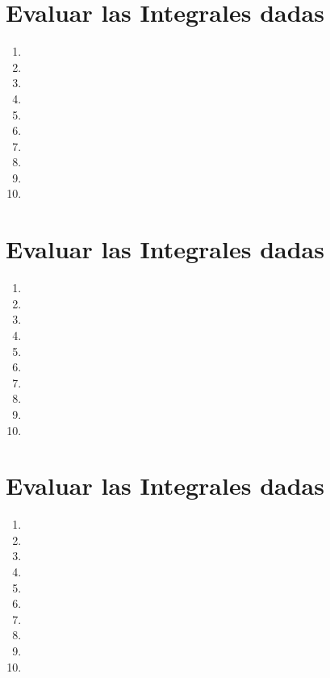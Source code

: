 \documentclass[11pt]{article}
\begin{document}
\section{Evaluar las Integrales dadas}
\begin{enumerate}[resume,label=\textbf{\arabic*.}]
    \item 
    \item 
    \item 
    \item 
    \item 
    \item 
    \item 
    \item 
    \item 
    \item 
\end{enumerate}
\section{Evaluar las Integrales dadas}
\begin{enumerate}[resume,label=\textbf{\arabic*.}]
    \item 
    \item 
    \item 
    \item 
    \item 
    \item 
    \item 
    \item 
    \item 
    \item 
\end{enumerate}
\section{Evaluar las Integrales dadas}
\begin{enumerate}[resume,label=\textbf{\arabic*.}]
    \item 
    \item 
    \item 
    \item 
    \item 
    \item 
    \item 
    \item 
    \item 
    \item 
\end{enumerate}
\end{document}
